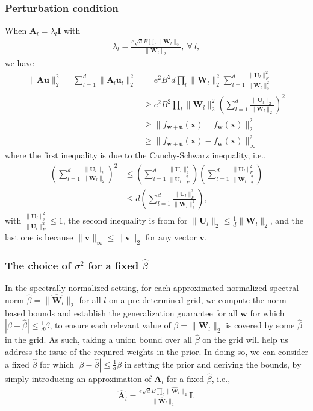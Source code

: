 \documentclass[journal]{IEEEtran} %
\newcommand{\nn}{\nonumber}
\def\vu{{\bm{u}}}
\def\vv{{\bm{v}}}
\def\vw{{\bm{w}}}
\def\vx{{\bm{x}}}
\def\mA{{\bm{A}}}
\def\mI{{\bm{I}}}
\def\mU{{\bm{U}}}
\def\mW{{\bm{W}}}
\newcommand{\Norm}[1]{\|#1\|}
\newcommand{\Abs}[1]{|#1|}
\begin{document}
\subsubsection{Perturbation condition}
When $\mA_l = \lambda_l \mI$ with
\begin{align}
        \lambda_l =  \frac{ e\sqrt{d}B \prod_l \Norm{\mW_l}_2}{\Norm{\mW_l}_2}, \ \forall~l,
    \end{align}
we have
\begin{align}
    \Norm{\mA \vu}_2^2 = \sum_{l=1}^d\Norm{\mA_l \vu_l}_2^2 &= e^2B^2 d\prod_l \Norm{\mW_l}_2^2  \sum_{l=1}^d \frac{\Norm{\mU_l}_F^2}{\Norm{\mW_l}_2^2} \\
    &\ge e^2B^2 \prod_l \Norm{\mW_l}_2^2 \left(\sum_{l=1}^d \frac{\Norm{\mU_l}_2}{\Norm{\mW_l}_2}\right)^2 \nn\\
    &\ge \Norm{f_{\vw+\vu}(\vx)-f_{\vw}(\vx)}_2^2\\
    &\ge \Norm{f_{\vw+\vu}(\vx)-f_{\vw}(\vx)}_\infty^2
\end{align}
where the first inequality is due to the Cauchy-Schwarz inequality, i.e., 
\begin{align}
\left(\sum_{l=1}^d \frac{\Norm{\mU_l}_2}{\Norm{\mW_l}_2}\right)^2 &\le  \left(\sum_{l=1}^d \frac{\Norm{\mU_l}_2^2}{\Norm{\mU_l}_F^2}\right) \left(\sum_{l=1}^d \frac{\Norm{\mU_l}_F^2}{\Norm{\mW_l}_2^2}\right) \\
&\le d \left(\sum_{l=1}^d \frac{\Norm{\mU_l}_F^2}{\Norm{\mW_l}_2^2}\right), 
\end{align}
with $\frac{\Norm{\mU_l}_2^2}{\Norm{\mU_l}_F^2} \le 1$, 
the second inequality is from \cite[Lemma~2]{neyshabur2018pac} for $\Norm{\mU_l}_2 \le \frac{1}{d}\Norm{\mW_l}_2$, and the last one is because $\Norm{\vv}_\infty \le \Norm{\vv}_2$ for any vector $\vv$.

\subsubsection{The choice of $\sigma^2$ for a fixed $\hat{\beta}$}
In the spectrally-normalized setting, for each approximated normalized spectral norm $\hat{\beta}=\Norm{\hat{\mW}_l}_2$ for all $l$ on a pre-determined grid, we compute the norm-based bounds and establish the generalization guarantee for all $\vw$ for which $\Abs{\beta-\hat{\beta}} \le \frac{1}{d}\beta$, to ensure each relevant value of $\beta=\Norm{{\mW}_l}_2$ is covered by some $\hat{\beta}$ in the grid. As such, taking a union bound over all $\hat{\beta}$ on the grid will help us address the issue of the required weights in the prior. In doing so, we can consider a fixed $\hat{\beta}$ for which $\Abs{\beta-\hat{\beta}} \le \frac{1}{d}\beta$ in setting the prior and deriving the bounds, by simply introducing an approximation of $\mA_l$ for a fixed $\hat{\beta}$, i.e.,
\begin{align}
    \hat{\mA}_l =  \frac{e\sqrt{d}B \prod_l \Norm{\hat{\mW}_l}_2  }{\Norm{\hat{\mW}_l}_2} \mI.
\end{align}
\end{document}
